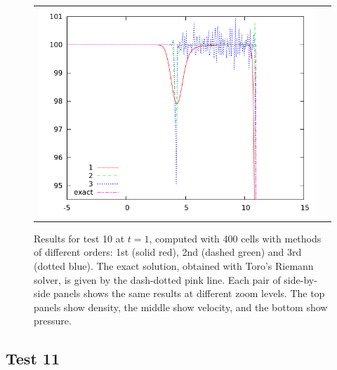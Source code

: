 \documentclass[10pt]{article}
\begin{document}
\begin{figure}[h]
\begin{center}
\begin{tabular}{cc}
      \includegraphics[width=.4\textwidth]{prs10zoom.png} \\
	\end{tabular}	
  \end{center}
  \caption{Results for test 10 at $t=1$, computed with 400 cells with methods of different orders: 1st (solid red), 2nd (dashed green) and 3rd (dotted blue). The exact solution, obtained with Toro's Riemann solver, is given by the dash-dotted pink line. Each pair of side-by-side panels shows the same results at different zoom levels. The top panels show density, the middle show velocity, and the bottom show pressure.}
\end{figure}



\clearpage

\subsection{Test 11}
\end{document}
